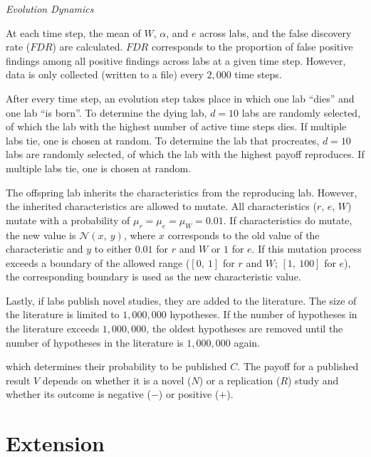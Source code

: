 \documentclass[meta, authordate]{jote-new-article}
\begin{document}
\begin{adjustwidth}{-4cm}{}
\begin{tcolorbox}
{      \vspace*{\baselineskip}
      \noindent\emph{Evolution Dynamics}
      \vspace*{\baselineskip}

      \noindent At each time step, the mean of $W$, $\alpha$, and $e$ across labs, and the false discovery rate ($FDR$) are calculated. $FDR$ corresponds to the proportion of false positive findings among all positive findings across labs at a given time step. However, data is only collected (written to a file) every $2,000$ time steps.

      After every time step, an evolution step takes place in which one lab ``dies'' and one lab ``is born''. To determine the dying lab, $d=10$ labs are randomly selected, of which the lab with the highest number of active time steps dies. If multiple labs tie, one is chosen at random. To determine the lab that procreates, $d=10$ labs are randomly selected, of which the lab with the highest payoff reproduces. If multiple labs tie, one is chosen at random.

      The offspring lab inherits the characteristics from the reproducing lab. However, the inherited characteristics are allowed to mutate. All characteristics ($r$, $e$, $W$) mutate with a probability of $\mu_r=\mu_e=\mu_W=0.01$. If characteristics do mutate, the new value is $\mathcal{N}\left(x,~y\right)$, where $x$ corresponds to the old value of the characteristic and $y$ to either $0.01$ for $r$ and $W$ or $1$ for $e$. If this mutation process exceeds a boundary of the allowed range ($\left[0,~1\right]$ for $r$ and $W$; $\left[1,~100\right]$ for $e$), the corresponding boundary is used as the new characteristic value.

      Lastly, if labs publish novel studies, they are added to the literature. The size of the literature is limited to $1,000,000$ hypotheses. If  the number of hypotheses in the literature exceeds $1,000,000$, the oldest hypotheses are removed until the number of hypotheses in the literature is $1,000,000$ again.

    }
  \end{tcolorbox}
\end{adjustwidth}
%


\noindent which determines their probability to be published $C$. The payoff for a published result $V$ depends on whether it is a novel ($N$) or a replication ($R$) study and whether its outcome is negative ($-$) or positive ($+$).


\section{Extension}
\end{document}
